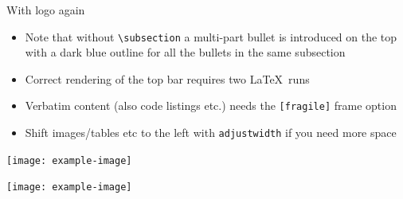 \documentclass[t,handout,aspectratio=169]{beamer}
\begin{document}
\begin{frame}[fragile]{With logo again}
\begin{itemize}
\item Note that without \verb+\subsection+ a multi-part bullet is introduced on the top with a dark blue outline for all the bullets in the same subsection
\item Correct rendering of the top bar requires two \LaTeX\ runs
\item Verbatim content (also code listings etc.) needs the \texttt{[fragile]} frame option
\item Shift images/tables etc to the left with \verb+adjustwidth+ if you need more space
\end{itemize}
\texttt{[image: example-image]}
\begin{adjustwidth}{-8mm}{0mm}
\texttt{[image: example-image]}
\end{adjustwidth}
\end{frame}
\end{document}
